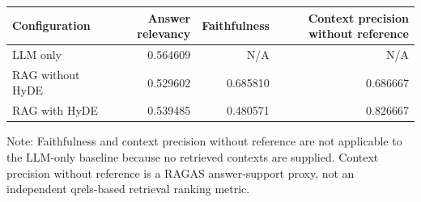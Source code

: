 \begin{tabular}{lrrr}
\toprule
Configuration & Answer relevancy & Faithfulness & Context precision without reference \\
\midrule
LLM only & 0.564609 & N/A & N/A \\
RAG without HyDE & 0.529602 & 0.685810 & 0.686667 \\
RAG with HyDE & 0.539485 & 0.480571 & 0.826667 \\
\bottomrule
\end{tabular}

\vspace{2pt}
\parbox{0.95\linewidth}{\footnotesize Note: Faithfulness and context precision without reference are not applicable to the LLM-only baseline because no retrieved contexts are supplied. Context precision without reference is a RAGAS answer-support proxy, not an independent qrels-based retrieval ranking metric.}
